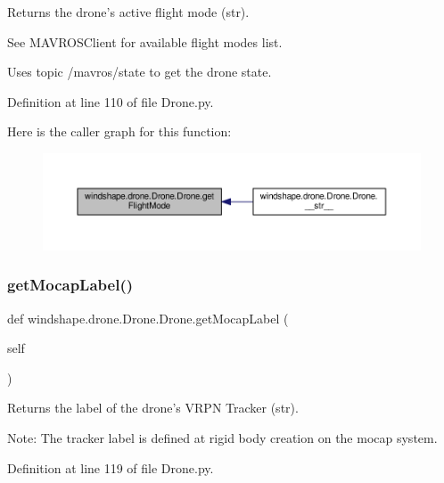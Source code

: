 \begin{DoxyVerb}Returns the drone's active flight mode (str).

See MAVROSClient for available flight modes list.

Uses topic /mavros/state to get the drone state.
\end{DoxyVerb}
 

Definition at line 110 of file Drone.\+py.

Here is the caller graph for this function\+:\nopagebreak
\begin{figure}[H]
\begin{center}
\leavevmode
\includegraphics[width=350pt]{classwindshape_1_1drone_1_1_drone_1_1_drone_a05934a953a52558fd19b18435c52cc40_icgraph}
\end{center}
\end{figure}
\mbox{\label{classwindshape_1_1drone_1_1_drone_1_1_drone_ac29dae974ab7bb13d250dbb752e20853}} 
\subsubsection{\texorpdfstring{get\+Mocap\+Label()}{getMocapLabel()}}
{\footnotesize\ttfamily def windshape.\+drone.\+Drone.\+Drone.\+get\+Mocap\+Label (\begin{DoxyParamCaption}\item[{}]{self }\end{DoxyParamCaption})}

\begin{DoxyVerb}Returns the label of the drone's VRPN Tracker (str).

Note:
    The tracker label is defined at rigid body creation on the
    mocap system.
\end{DoxyVerb}
 

Definition at line 119 of file Drone.\+py.

